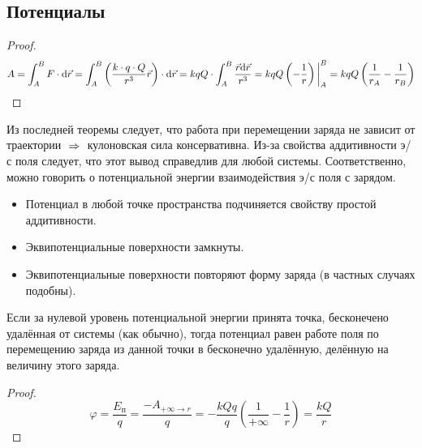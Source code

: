 \subsection{Потенциалы}
\begin{proof}
	\[ A = \int_A^B F \cdot \text{d} \vec{r} = \int_A^B \left( \frac{k \cdot q \cdot Q}{r^3} \vec{r} \right) \cdot \text{d} \vec{r} = kqQ \cdot \int_A^B \frac{\vec{r} \text{d} \vec{r}}{r^3} = kqQ \left(-\frac{1}{r} \right) \bigg|_{A}^{B} = kqQ \left( \frac{1}{r_A} - \frac{1}{r_B} \right) \]
\end{proof}

Из последней теоремы следует, что работа при перемещении заряда не зависит от траектории $\;\Rightarrow\;$ кулоновская сила консервативна. Из-за свойства аддитивности э/с поля следует, что этот вывод справедлив для любой системы. Соответственно, можно говорить о потенциальной энергии взаимодействия э/с поля с зарядом.\par


\begin{itemize}
	\item Потенциал в любой точке пространства подчиняется свойству простой аддитивности.
	\item Эквипотенциальные поверхности замкнуты.
	\item Эквипотенциальные поверхности повторяют форму заряда (в частных случаях подобны).
\end{itemize}

Если за нулевой уровень потенциальной энергии принята точка, бесконечено удалённая от системы (как обычно), тогда потенциал равен работе поля по перемещению заряда из данной точки в бесконечно удалённую, делённую на величину этого заряда.

\begin{proof}
	\[ \varphi = \frac{E_\text{п}}{q} = \frac{-A_{+\infty \to r}}{q} = -\frac{kQq}{q}\left( \frac{1}{+\infty} - \frac{1}{r} \right) = \frac{kQ}{r} \]
\end{proof}

